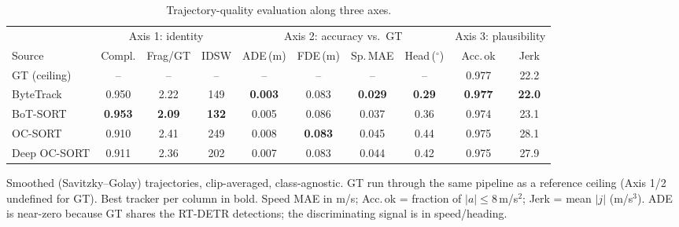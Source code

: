 \begin{table}[ht]
  \centering
  \caption{Trajectory-quality evaluation along three axes.}
  \label{tab:trajectory}
  \begin{tabular}{lccccccccc}
    \toprule
    & \multicolumn{3}{c}{Axis 1: identity} & \multicolumn{4}{c}{Axis 2: accuracy vs.\ GT} & \multicolumn{2}{c}{Axis 3: plausibility} \\
    \cmidrule(lr){2-4}\cmidrule(lr){5-8}\cmidrule(lr){9-10}
    Source & Compl. & Frag/GT & IDSW & ADE\,(m) & FDE\,(m) & Sp.\,MAE & Head\,($^\circ$) & Acc.\,ok & Jerk \\
    \midrule
    GT (ceiling) & -- & -- & -- & -- & -- & -- & -- & 0.977 & 22.2 \\
    ByteTrack & 0.950 & 2.22 & 149 & \textbf{0.003} & 0.083 & \textbf{0.029} & \textbf{0.29} & \textbf{0.977} & \textbf{22.0} \\
    BoT-SORT & \textbf{0.953} & \textbf{2.09} & \textbf{132} & 0.005 & 0.086 & 0.037 & 0.36 & 0.974 & 23.1 \\
    OC-SORT & 0.910 & 2.41 & 249 & 0.008 & \textbf{0.083} & 0.045 & 0.44 & 0.975 & 28.1 \\
    Deep OC-SORT & 0.911 & 2.36 & 202 & 0.007 & 0.083 & 0.044 & 0.42 & 0.975 & 27.9 \\
    \bottomrule
  \end{tabular}
  \par\smallskip
  \footnotesize Smoothed (Savitzky--Golay) trajectories, clip-averaged, class-agnostic. GT run through the same pipeline as a reference ceiling (Axis 1/2 undefined for GT). Best tracker per column in bold. Speed MAE in m/s; Acc.\,ok = fraction of $|a|\le 8$\,m/s$^2$; Jerk = mean $|j|$ (m/s$^3$). ADE is near-zero because GT shares the RT-DETR detections; the discriminating signal is in speed/heading.
\end{table}
